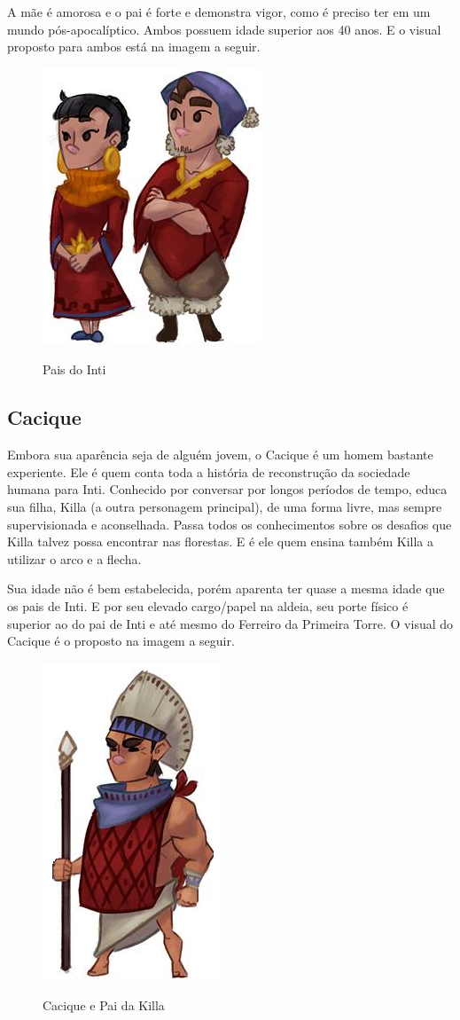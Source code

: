 \documentclass[12pt]{article}
\begin{document}
A mãe é amorosa e o pai é forte e demonstra vigor, como é preciso ter em um
mundo pós-apocalíptico. Ambos possuem idade superior aos 40 anos. E o visual
proposto para ambos está na imagem a seguir.

\begin{figure}[!htb]
    \centering
    \includegraphics[scale=0.9]{pais_do_inti.jpg}
    \label{fig:pais_do_inti}
    \caption{Pais do Inti}
\end{figure}

\newpage

\subsection{Cacique}
Embora sua aparência seja de alguém jovem, o Cacique é um homem bastante
experiente. Ele é quem conta toda a história de reconstrução da sociedade
humana para Inti. Conhecido por conversar por longos períodos de tempo, educa
sua filha, Killa (a outra personagem principal), de uma forma livre, mas sempre
supervisionada e aconselhada. Passa todos os conhecimentos sobre os desafios que
Killa talvez possa encontrar nas florestas. E é ele quem ensina também Killa a
utilizar o arco e a flecha.

Sua idade não é bem estabelecida, porém aparenta ter quase a mesma idade que os
pais de Inti. E por seu elevado cargo/papel na aldeia, seu porte físico é
superior ao do pai de Inti e até mesmo do Ferreiro da Primeira Torre. O visual
do Cacique é o proposto na imagem a seguir.

\begin{figure}[!htb]
    \centering
    \includegraphics[scale=0.9]{cacique_pai_da_killa.jpg}
    \label{fig:cacique_pai_da_killa}
    \caption{Cacique e Pai da Killa}
\end{figure}
\end{document}
